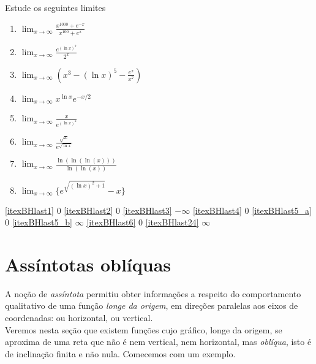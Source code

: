 \begin{exo}
Estude os seguintes limites
\begin{multicols}{2}
\begin{enumerate}
\item\label{itexBHlast1} $\lim_{x\to \infty}\frac{x^{1000}+e^{-x}}{x^{100}+e^x}$
\item\label{itexBHlast2} $\lim_{x\to \infty}\frac{e^{(\ln x)^2}}{2^{x}}$
\item\label{itexBHlast3} $\lim_{x\to \infty}(x^3-(\ln x)^5-\frac{e^x}{x^7})$
\item\label{itexBHlast4} $\lim_{x\to \infty}x^{\ln x}e^{-x/2}$
\item\label{itexBHlast5_a} $\lim_{x\to \infty}\frac{x}{e^{(\ln x)^2}}$
\item\label{itexBHlast5_b} $\lim_{x\to \infty}\frac{\sqrt{x}}{e^{\sqrt{\ln x}}}$
\item\label{itexBHlast6} $\lim_{x\to
\infty}\frac{\ln(\ln(\ln(x)))}{\ln(\ln(x))}$
\item\label{itexBHlast24}
$\lim_{x\to\infty}\{e^{\sqrt{(\ln x)^2+1}}-x\}$
\end{enumerate}
\end{multicols}
\vspace{0.01cm}
\begin{sol}
\eqref{itexBHlast1} $0$
\eqref{itexBHlast2} $0$
\eqref{itexBHlast3} $-\infty$
\eqref{itexBHlast4} $0$
\eqref{itexBHlast5_a} $0$ 
\eqref{itexBHlast5_b} $\infty$ 
\eqref{itexBHlast6} $0$
\eqref{itexBHlast24} $\infty$
\end{sol}
\end{exo}


\section{Assíntotas oblíquas}\label{Sec:Obliquas}
A noção de \emph{assíntota} permitiu obter informações a respeito do comportamento
qualitativo de uma função \emph{longe da origem}, em direções paralelas aos eixos de
coordenadas: ou horizontal, ou vertical.\\

Veremos nesta seção que existem funções cujo gráfico, longe da origem, 
se aproxima de uma reta que não é nem vertical, nem horizontal, mas \emph{oblíqua},
isto é de inclinação finita  e não nula. Comecemos com um exemplo.

